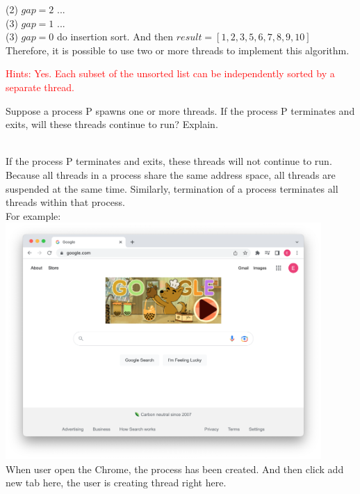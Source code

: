 \documentclass[12pt]{article}
\newenvironment{sol}[1][Solution]{\begin{trivlist}\item[\hskip\labelsep {\bfseries #1:}]}{\end{trivlist}}
\begin{document}
\begin{enumerate}
\begin{sol}
(2) $gap = 2$ ... \\
(3) $gap = 1$ ...\\
(3) $gap = 0$ do insertion sort. And then $result = [1, 2, 3, 5, 6, 7, 8, 9, 10]$ \\
Therefore, it is possible to use two or more threads to implement this algorithm.


\end{sol}
\textcolor{red}{Hints: Yes. Each subset of the unsorted list can be independently sorted by a separate thread.}

\newpage
\item Suppose a process P spawns one or more threads. If the process P terminates and exits, will these threads continue to run? Explain.
\begin{sol}
\hspace*{\fill} \\
If the process P terminates and exits, these threads will not continue to run. \\
Because all threads in a process share the same address space, all threads are suspended at the same time. Similarly, termination of a process terminates all threads within that process.\\
For example:\\
    \includegraphics[width=0.9\textwidth]{problem7.png}\\
    When user open the Chrome, the process has been created. And then click add new tab here, the user is creating thread right here. \\

\end{sol}
\end{enumerate}
\end{document}
